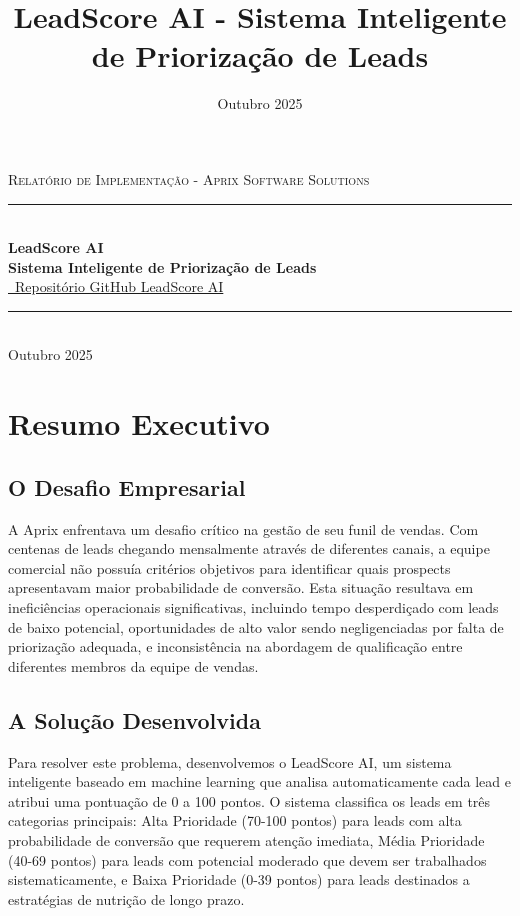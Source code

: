 \documentclass[portuguese,11pt]{article}
\title{LeadScore AI - Sistema Inteligente de Priorização de Leads}
\date{Outubro 2025}
\newcommand{\HRule}{\rule{\linewidth}{0.5mm}}
\begin{document}
\begin{titlepage}
  \begin{center}
    \vspace*{2cm}
    \textsc{\Large Relatório de Implementação - Aprix Software Solutions}\\[0.5cm]
    \HRule \\[0.4cm]
    {\huge \bfseries LeadScore AI\\[0.2cm]
    Sistema Inteligente de Priorização de Leads\\[0.4cm]}
    \href{https://github.com/LucasTramonte/LeadScore-AI-Lead-Prioritization-System}{\faGithub\, Repositório GitHub LeadScore AI}
    \HRule \\[1cm]
    \vfill
    {\large Outubro 2025}
  \end{center}
\end{titlepage}

\tableofcontents
\newpage

\section*{Resumo Executivo}

\subsection*{O Desafio Empresarial}
A Aprix enfrentava um desafio crítico na gestão de seu funil de vendas. Com centenas de leads chegando mensalmente através de diferentes canais, a equipe comercial não possuía critérios objetivos para identificar quais prospects apresentavam maior probabilidade de conversão. Esta situação resultava em ineficiências operacionais significativas, incluindo tempo desperdiçado com leads de baixo potencial, oportunidades de alto valor sendo negligenciadas por falta de priorização adequada, e inconsistência na abordagem de qualificação entre diferentes membros da equipe de vendas.

\subsection*{A Solução Desenvolvida}
Para resolver este problema, desenvolvemos o LeadScore AI, um sistema inteligente baseado em machine learning que analisa automaticamente cada lead e atribui uma pontuação de 0 a 100 pontos. O sistema classifica os leads em três categorias principais: Alta Prioridade (70-100 pontos) para leads com alta probabilidade de conversão que requerem atenção imediata, Média Prioridade (40-69 pontos) para leads com potencial moderado que devem ser trabalhados sistematicamente, e Baixa Prioridade (0-39 pontos) para leads destinados a estratégias de nutrição de longo prazo.
\end{document}
